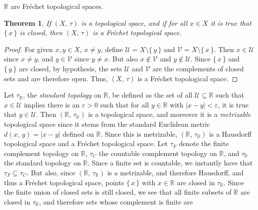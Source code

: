 \documentclass{article}
\theoremstyle{plain}
\newtheorem{theorem}{Theorem}[section]
\theoremstyle{normal}
\newenvironment{example}{%
    \pushQED{\qed}\renewcommand{\qedsymbol}{$\blacksquare$}\examplex%
}{%
    \popQED\endexamplex%
}
\begin{document}
    $\mathbb{R}$ are Fr\'{e}chet topological spaces.
    \begin{theorem}
        If $(X,\,\tau)$ is a topological space, and if for all $x\in{X}$ it is
        true that $\{\,x\,\}$ is closed, then $(X,\,\tau)$ is a
        Fr\'{e}chet topological space.
    \end{theorem}
    \begin{proof}
        For given $x,y\in{X}$, $x\ne{y}$, define
        $\mathcal{U}=X\setminus\{\,y\,\}$ and $\mathcal{V}=X\setminus\{\,x\,\}$.
        Then $x\in\mathcal{U}$ since $x\ne{y}$, and
        $y\in\mathcal{V}$ since $y\ne{x}$. But also
        $x\notin\mathcal{V}$ and $y\notin\mathcal{U}$. Since
        $\{\,x\,\}$ and $\{\,y\,\}$ are closed, by hypothesis, the sets
        $\mathcal{U}$ and $\mathcal{V}$ are the complements of closed sets
        and are therefore open. Thus, $(X,\,\tau)$ is a Fr\'{e}chet topological
        space.
    \end{proof}
    \begin{example}[\textbf{Standard Topology on $\mathbb{R}$}]
        Let $\tau_{\mathbb{R}}$, the \textit{standard topology} on
        $\mathbb{R}$, be defined as the set of all
        $\mathcal{U}\subseteq\mathbb{R}$ such that $x\in\mathcal{U}$ implies
        there is an $\varepsilon>0$ such that for all $y\in\mathbb{R}$ with
        $|x-y|<\varepsilon$, it is true that $y\in\mathcal{U}$. Then
        $(\mathbb{R},\,\tau_{\mathbb{R}})$ is a topological space, and moreover
        it is a \textit{metrizable} topological space since it stems from the
        standard Euclidean metric $d(x,\,y)=|x-y|$ defined on $\mathbb{R}$.
        Since this is metrizable, $(\mathbb{R},\,\tau_{\mathbb{R}})$ is
        a Hausdorff topological space and a Fr\'{e}chet topological space.
    \end{example}
    Let $\tau_{F}$ denote the finite complement topology on $\mathbb{R}$,
    $\tau_{C}$ the countable complement topology on $\mathbb{R}$, and
    $\tau_{\mathbb{R}}$ the standard topology on $\mathbb{R}$. Since a finite
    set is countable, we instantly have that $\tau_{F}\subseteq\tau_{C}$.
    But also, since $(\mathbb{R},\,\tau_{\mathbb{R}})$ is a metrizable,
    and therefore Hausdorff, and thus a Fr\'{e}chet topological space,
    points $\{\,x\,\}$ with $x\in\mathbb{R}$ are closed in
    $\tau_{\mathbb{R}}$. Since the finite union of closed sets is still closed,
    we see that all finite subsets of $\mathbb{R}$ are closed in
    $\tau_{\mathbb{R}}$, and therefore sets whose complement is finite are
\end{document}
